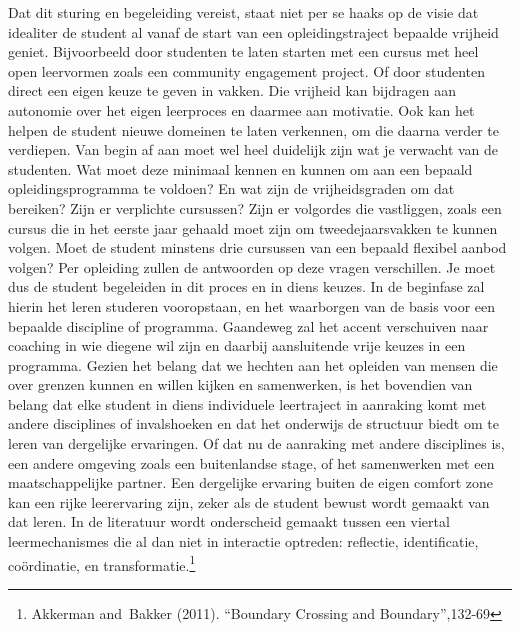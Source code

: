 \documentclass[empirical, authordate, ]{new-jote-article}
\begin{document}
	Dat dit sturing en begeleiding vereist, staat niet per se haaks op de visie dat idealiter de student al vanaf de start van een opleidingstraject bepaalde vrijheid geniet. Bijvoorbeeld door studenten te laten starten met een cursus met heel open leervormen zoals een community engagement project. Of door studenten direct een eigen keuze te geven in vakken. Die vrijheid kan bijdragen aan autonomie over het eigen leerproces en daarmee aan motivatie. Ook kan het helpen de student nieuwe domeinen te laten verkennen, om die daarna verder te verdiepen. Van begin af aan moet wel heel duidelijk zijn wat je verwacht van de studenten. Wat moet deze minimaal kennen en kunnen om aan een bepaald opleidingsprogramma te voldoen? En wat zijn de vrijheidsgraden om dat bereiken? Zijn er verplichte cursussen? Zijn er volgordes die vastliggen, zoals een cursus die in het eerste jaar gehaald moet zijn om tweedejaarsvakken te kunnen volgen. Moet de student minstens drie cursussen van een bepaald flexibel aanbod volgen? Per opleiding zullen de antwoorden op deze vragen verschillen. Je moet dus de student begeleiden in dit proces en in diens keuzes. In de beginfase zal hierin het leren studeren vooropstaan, en het waarborgen van de basis voor een bepaalde discipline of programma. Gaandeweg zal het accent verschuiven naar coaching in wie diegene wil zijn en daarbij aansluitende vrije keuzes in een programma. Gezien het belang dat we hechten aan het opleiden van mensen die over grenzen kunnen en willen kijken en samenwerken, is het bovendien van belang dat elke student in diens individuele leertraject in aanraking komt met andere disciplines of invalshoeken en dat het onderwijs de structuur biedt om te leren van dergelijke ervaringen. Of dat nu de aanraking met andere disciplines is, een andere omgeving zoals een buitenlandse stage, of het samenwerken met een maatschappelijke partner. Een dergelijke ervaring buiten de eigen comfort zone kan een rijke leerervaring zijn, zeker als de student bewust wordt gemaakt van dat leren. In de literatuur wordt onderscheid gemaakt tussen een viertal leermechanismes die al dan niet in interactie optreden: reflectie, identificatie, coördinatie, en transformatie.\footnote{Akkerman and Bakker (2011). “Boundary Crossing and Boundary”,132-69}
\end{document}
